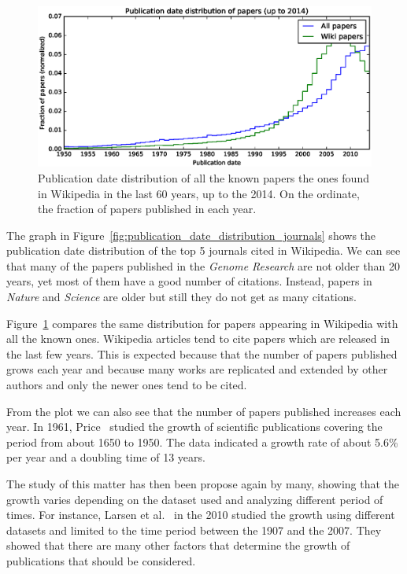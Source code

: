 \begin{figure}[h]
\centering
\includegraphics[keepaspectratio=true, width=\textwidth]{assets/publication_date_pdf}
\caption{Publication date distribution of all the known papers the ones found in Wikipedia in the last 60 years, up to the 2014.
On the ordinate, the fraction of papers published in each year.
}
\label{fig:publication_date_pdf}
\end{figure}

The graph in Figure~\ref{fig:publication_date_distribution_journals} shows the publication date distribution of the top 5 journals cited in Wikipedia.
We can see that many of the papers published in the \emph{Genome Research} are not older than 20 years, yet most of them have a good number of citations.
Instead, papers in \emph{Nature} and \emph{Science} are older but still they do not get as many citations.

Figure~\ref{fig:publication_date_pdf} compares the same distribution for papers appearing in Wikipedia with all the known ones.
Wikipedia articles tend to cite papers which are released in the last few years.
This is expected because that the number of papers published grows each year and because many works are replicated and extended by other authors and only the newer ones tend to be cited.

From the plot we can also see that the number of papers published increases each year.
In 1961, Price~\cite{Price1961} studied the growth of scientific publications covering the period from about 1650 to 1950.
The data indicated a growth rate of about 5.6\% per year and a doubling time of 13 years.

The study of this matter has then been propose again by many, showing that the growth varies depending on the dataset used and analyzing different period of times.
For instance, Larsen et al.~\cite{Larsen2010} in the 2010 studied the growth using different datasets and limited to the time period between the 1907 and the 2007.
They showed that there are many other factors that determine the growth of publications that should be considered.


